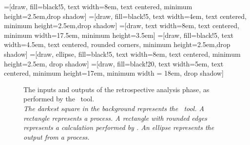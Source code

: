 
\newcommand{\mx}[1]{\mathbf{\bm{#1}}} %
\newcommand{\vc}[1]{\mathbf{\bm{#1}}} %



=[draw, fill=black!5, text width=8em,
    text centered, minimum height=2.5em,drop shadow]
=[draw, fill=black!5, text width=4em,
    text centered, minimum height=2.5em,drop shadow]
=[draw, text width=8em,
    text centered, minimum width=17.5em, minimum height=3.5em]
=[draw, fill=black!5, text width=4.5em,
    text centered, rounded corners, minimum height=2.5em,drop shadow]
=[draw, ellipse, fill=black!5, text width=8em,
    text centered, minimum height=2.5em, drop shadow]
=[draw, fill=black!20, text width=5em,
    text centered, minimum height=17em, minimum width = 18em, drop shadow]

\def\blockdist{1.5}
\def\edgedist{2.5}

\begin{figure}[t]
  \centering

\caption{\label{fig:mrstudyr}The inputs and outputs of the retrospective analysis phase, as performed by the \mr~tool.
\\ \textit{The darkest square in the background represents the \mr~tool.  A rectangle represents a process. A rectangle
with rounded edges represents a calculation performed by \mr. An ellipse represents the output from a process.}}

\end{figure}

